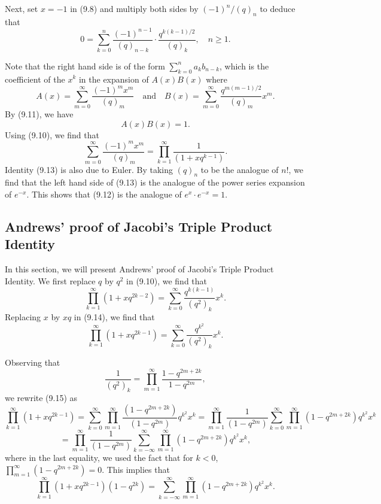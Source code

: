 \documentclass{article}
\begin{document}
Next, set $x = -1$ in (9.8) and multiply both sides by $(-1)^n/(q)_n$ to deduce that
\begin{equation}
0 = \sum_{k=0}^{n} \frac{(-1)^{n-1}}{(q)_{n-k}} \cdot \frac{q^{k(k-1)/2}}{(q)_k}, \quad n \geq 1.
\tag{9.11}
\end{equation}

Note that the right hand side is of the form $\sum_{k=0}^{n} a_k b_{n-k}$, which is the coefficient
of the $x^k$ in the expansion of $A(x)B(x)$ where
\[
A(x) = \sum_{m=0}^{\infty} \frac{(-1)^m x^m}{(q)_m} \quad\text{and}\quad B(x) = \sum_{m=0}^{\infty} \frac{q^{m(m-1)/2}}{(q)_m} x^m.
\]
By (9.11), we have
\begin{equation}
A(x)B(x) = 1.
\tag{9.12}
\end{equation}
Using (9.10), we find that
\begin{equation}
\sum_{m=0}^{\infty} \frac{(-1)^m x^m}{(q)_m} = \prod_{k=1}^{\infty} \frac{1}{(1+xq^{k-1})}.
\tag{9.13}
\end{equation}
Identity (9.13) is also due to Euler. By taking $(q)_n$ to be the analogue of $n!$, we
find that the left hand side of (9.13) is the analogue of the power series expansion
of $e^{-x}$. This shows that (9.12) is the analogue of $e^x \cdot e^{-x} = 1$.

\subsection{Andrews' proof of Jacobi's Triple Product Identity}

In this section, we will present Andrews' proof of Jacobi's Triple Product Identity.
We first replace $q$ by $q^2$ in (9.10), we find that
\begin{equation}
\prod_{k=1}^{\infty} (1 + xq^{2k-2}) = \sum_{k=0}^{\infty} \frac{q^{k(k-1)}}{(q^2)_k} x^k.
\tag{9.14}
\end{equation}
Replacing $x$ by $xq$ in (9.14), we find that
\begin{equation}
\prod_{k=1}^{\infty} (1 + xq^{2k-1}) = \sum_{k=0}^{\infty} \frac{q^{k^2}}{(q^2)_k} x^k.
\tag{9.15}
\end{equation}

Observing that
\[
\frac{1}{(q^2)_k} = \prod_{m=1}^{\infty} \frac{1-q^{2m+2k}}{1-q^{2m}},
\]
we rewrite (9.15) as
\[
\prod_{k=1}^{\infty} (1+xq^{2k-1}) = \sum_{k=0}^{\infty} \prod_{m=1}^{\infty} \frac{(1-q^{2m+2k})}{(1-q^{2m})} q^{k^2} x^k
= \prod_{m=1}^{\infty} \frac{1}{(1-q^{2m})} \sum_{k=0}^{\infty} \prod_{m=1}^{\infty} (1-q^{2m+2k}) q^{k^2} x^k
\]
\[
= \prod_{m=1}^{\infty} \frac{1}{(1-q^{2m})} \sum_{k=-\infty}^{\infty} \prod_{m=1}^{\infty} (1-q^{2m+2k}) q^{k^2} x^k,
\]
where in the last equality, we used the fact that for $k < 0$,
$\prod_{m=1}^{\infty} (1-q^{2m+2k}) = 0$.
This implies that
\begin{equation}
\prod_{k=1}^{\infty} (1+xq^{2k-1})(1-q^{2k}) = \sum_{k=-\infty}^{\infty} \prod_{m=1}^{\infty} (1-q^{2m+2k}) q^{k^2} x^k.
\tag{9.16}
\end{equation}
\end{document}
